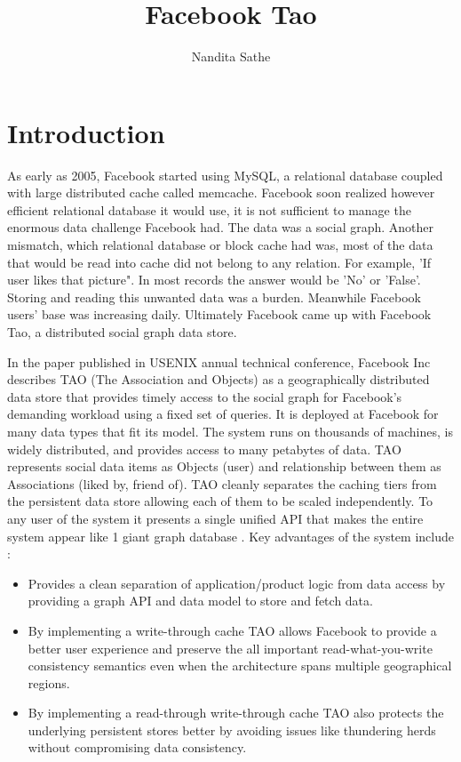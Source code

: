 \documentclass[9pt,twocolumn,twoside]{../../styles/osajnl}
\title{Facebook Tao}
\author[1,*]{Nandita Sathe}
\affil[1]{School of Informatics and Computing, Bloomington, IN 47408, U.S.A.}
\affil[*]{Corresponding author: nsathe@iu.edu}
\begin{document}
\maketitle

\section{Introduction}

As early as 2005, Facebook started using MySQL, a relational database coupled with large distributed cache called memcache. Facebook soon realized however efficient relational database it would use, it is not sufficient to manage the enormous data challenge Facebook had. The data was a social graph. Another mismatch, which relational database or block cache had was, most of the data that would be read into cache did not belong to any relation. For example, 'If user likes that picture". In most records the answer would be 'No' or 'False'. Storing and reading this unwanted data was a burden. Meanwhile Facebook users' base was increasing daily. Ultimately Facebook came up with Facebook Tao, a distributed social graph data store.

In the paper published in USENIX annual technical conference, Facebook Inc describes TAO (The Association and Objects) as \cite{book-tao1} a geographically distributed data store that provides timely access to the social graph for Facebook’s demanding workload using a fixed set of queries. It is deployed at Facebook for many data types that fit its model. The system runs on thousands of machines, is widely distributed, and provides access to many petabytes of data. TAO represents social data items as Objects (user) and relationship between them as Associations (liked by, friend of). TAO cleanly separates the caching tiers from the persistent data store allowing each of them to be scaled independently. To any user of the system it presents a single unified API that makes the entire system appear like 1 giant graph database \cite{www-tao1}.
Key advantages of the system include \cite{www-tao1}:
\begin{itemize}
\item Provides a clean separation of application/product logic from data access by providing a graph API and data model to store and fetch data.
\item By implementing a write-through cache TAO allows Facebook to provide a better user experience and preserve the all important read-what-you-write consistency semantics even when the architecture spans multiple geographical regions.
\item By implementing a read-through write-through cache TAO also protects the underlying persistent stores better by avoiding issues like thundering herds without compromising data consistency.

\end{itemize}
\end{document}
